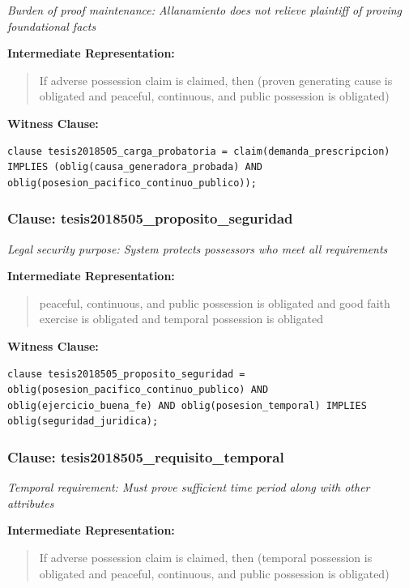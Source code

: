 \documentclass[11pt,a4paper]{article}
\begin{document}
\textit{Burden of proof maintenance: Allanamiento does not relieve plaintiff of proving foundational facts}

\textbf{Intermediate Representation:}

\begin{quote}
If adverse possession claim is claimed, then (proven generating cause is obligated and peaceful, continuous, and public possession is obligated)
\end{quote}

\textbf{Witness Clause:}

\begin{lstlisting}[style=witnessstyle, language=Witness]
clause tesis2018505_carga_probatoria = claim(demanda_prescripcion) IMPLIES (oblig(causa_generadora_probada) AND oblig(posesion_pacifico_continuo_publico));
\end{lstlisting}

\subsubsection{Clause: tesis2018505\_proposito\_seguridad}

\textit{Legal security purpose: System protects possessors who meet all requirements}

\textbf{Intermediate Representation:}

\begin{quote}
peaceful, continuous, and public possession is obligated and good faith exercise is obligated and temporal possession is obligated
\end{quote}

\textbf{Witness Clause:}

\begin{lstlisting}[style=witnessstyle, language=Witness]
clause tesis2018505_proposito_seguridad = oblig(posesion_pacifico_continuo_publico) AND oblig(ejercicio_buena_fe) AND oblig(posesion_temporal) IMPLIES oblig(seguridad_juridica);
\end{lstlisting}

\subsubsection{Clause: tesis2018505\_requisito\_temporal}

\textit{Temporal requirement: Must prove sufficient time period along with other attributes}

\textbf{Intermediate Representation:}

\begin{quote}
If adverse possession claim is claimed, then (temporal possession is obligated and peaceful, continuous, and public possession is obligated)
\end{quote}
\end{document}

